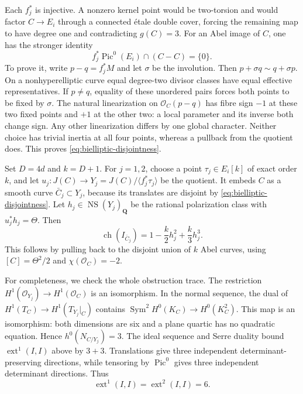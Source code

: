 \documentclass[11pt]{article}
\theoremstyle{definition}
\theoremstyle{remark}
\newcommand{\Q}{\mathbf Q}
\begin{document}
Each $f_j^*$ is injective. A nonzero kernel point would be two-torsion and would factor $C\to E_i$ through a connected \'etale double cover, forcing the remaining map to have degree one and contradicting $g(C)=3$. For an Abel image of $C$, one has the stronger identity
\begin{equation}\label{eq:bielliptic-disjointness}
 f_j^*\operatorname{Pic}^0(E_i)\cap(C-C)=\{0\}.
\end{equation}
To prove it, write $p-q=f_j^*M$ and let $\sigma$ be the involution. Then $p+\sigma q\sim q+\sigma p$. On a nonhyperelliptic curve equal degree-two divisor classes have equal effective representatives. If $p\ne q$, equality of these unordered pairs forces both points to be fixed by $\sigma$. The natural linearization on $\mathcal O_C(p-q)$ has fibre sign $-1$ at these two fixed points and $+1$ at the other two: a local parameter and its inverse both change sign. Any other linearization differs by one global character. Neither choice has trivial inertia at all four points, whereas a pullback from the quotient does. This proves \eqref{eq:bielliptic-disjointness}.

Set $D=4d$ and $k=D+1$. For $j=1,2$, choose a point
$\tau_j\in E_i[k]$ of exact order $k$, and let
$u_j:J(C)\to Y_j=J(C)/\langle f_j^*\tau_j\rangle$ be the quotient.
It embeds $C$ as a smooth curve $\bar C_j\subset Y_j$, because its
translates are disjoint by \eqref{eq:bielliptic-disjointness}.
Let $h_j\in\operatorname{NS}(Y_j)_{\Q}$ be the rational polarization
class with $u_j^*h_j=\Theta$. Then
\[
 \operatorname{ch}(I_{\bar C_j})=1-\frac{k}{2}h_j^2+\frac{k}{3}h_j^3.
\]
This follows by pulling back to the disjoint union of $k$ Abel curves, using $[C]=\Theta^2/2$ and $\chi(\mathcal O_C)=-2$.

For completeness, we check the whole obstruction trace. The restriction $H^1(\mathcal O_{Y_j})\to H^1(\mathcal O_C)$ is an isomorphism. In the normal sequence, the dual of $H^1(T_C)\to H^1(T_{Y_j}|_C)$ contains
$\operatorname{Sym}^2H^0(K_C)\to H^0(K_C^2)$. This map is an isomorphism: both dimensions are six and a plane quartic has no quadratic equation. Hence $h^0(N_{C/Y_j})=3$.
The ideal sequence and Serre duality bound $\operatorname{ext}^1(I,I)$ above by $3+3$. Translations give three independent determinant-preserving directions, while tensoring by $\operatorname{Pic}^0$ gives three independent determinant directions. Thus
\[
 \operatorname{ext}^1(I,I)=\operatorname{ext}^2(I,I)=6.
\]
\end{document}
